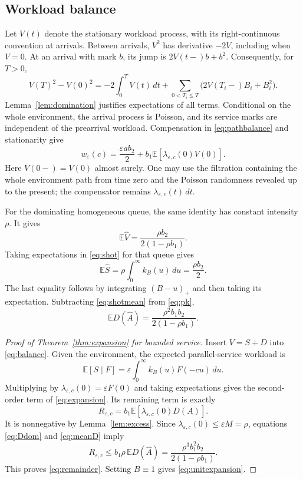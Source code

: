 \documentclass[11pt,reqno]{amsart}
\numberwithin{equation}{section}
\theoremstyle{plain}
\theoremstyle{definition}
\newcommand{\E}{\mathbb E}
\newcommand{\1}{\mathbf 1}
\newcommand{\eps}{\varepsilon}
\begin{document}
\subsection{Workload balance}
Let $V(t)$ denote the stationary workload process, with its right-continuous convention at arrivals. Between arrivals, $V^2$ has derivative $-2V$, including when $V=0$. At an arrival with mark $b$, its jump is $2V(t-)b+b^2$. Consequently, for $T>0$,
\begin{equation}\label{eq:pathbalance}
 V(T)^2-V(0)^2=-2\int_0^T V(t)\,dt
 +\sum_{0<T_i\le T}\bigl(2V(T_i-)B_i+B_i^2\bigr).
\end{equation}
Lemma~\ref{lem:domination} justifies expectations of all terms. Conditional on the whole environment, the arrival process is Poisson, and its service marks are independent of the prearrival workload. Compensation in \eqref{eq:pathbalance} and stationarity give
\begin{equation}\label{eq:balance}
 w_\eps(c)=\frac{\eps a b_2}{2}+b_1\E[\lambda_{\eps,c}(0)V(0)].
\end{equation}
Here $V(0-)=V(0)$ almost surely. One may use the filtration containing the whole environment path from time zero and the Poisson randomness revealed up to the present; the compensator remains $\lambda_{\eps,c}(t)\,dt$.

For the dominating homogeneous queue, the same identity has constant intensity $\rho$. It gives
\begin{equation}\label{eq:pk}
 \E\widehat V=\frac{\rho b_2}{2(1-\rho b_1)}.
\end{equation}
Taking expectations in \eqref{eq:shot} for that queue gives
\begin{equation}\label{eq:shotmean}
 \E\widehat S=\rho\int_0^\infty k_B(u)\,du=\frac{\rho b_2}{2}.
\end{equation}
The last equality follows by integrating $(B-u)_+$ and then taking its expectation. Subtracting \eqref{eq:shotmean} from \eqref{eq:pk},
\begin{equation}\label{eq:meanD}
 \E D(\widehat A)=\frac{\rho^2 b_1b_2}{2(1-\rho b_1)}.
\end{equation}
\begin{proof}[Proof of Theorem~\ref{thm:expansion} for bounded service]
Insert $V=S+D$ into \eqref{eq:balance}. Given the environment, the expected parallel-service workload is
\[
 \E[S\mid F]=\eps\int_0^\infty k_B(u)F(-cu)\,du.
\]
Multiplying by $\lambda_{\eps,c}(0)=\eps F(0)$ and taking expectations gives the second-order term of \eqref{eq:expansion}. Its remaining term is exactly
\begin{equation}\label{eq:Rexact}
 R_{\eps,c}=b_1\E[\lambda_{\eps,c}(0)D(A)].
\end{equation}
It is nonnegative by Lemma~\ref{lem:excess}. Since $\lambda_{\eps,c}(0)\le\eps M=\rho$, equations \eqref{eq:Ddom} and \eqref{eq:meanD} imply
\[
 R_{\eps,c}\le b_1\rho\,\E D(\widehat A)
 =\frac{\rho^3 b_1^2b_2}{2(1-\rho b_1)}.
\]
This proves \eqref{eq:remainder}. Setting $B\equiv1$ gives \eqref{eq:unitexpansion}.
\end{proof}
\end{document}
